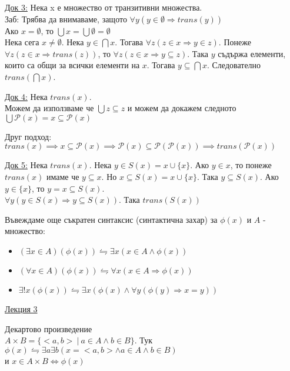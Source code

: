 \documentclass[fleqn, titlepage, 12pt]{report}
\begin{document}
\underline{Док 3:} Нека x е множество от транзитивни множества.\\
Заб: Трябва да внимаваме, защото $ \forall{y} (y \in \emptyset \Rightarrow trans(y) )$\\
Ако $x = \emptyset $, то $ \bigcup{x} = \bigcup{ \emptyset } = \emptyset $\\
Нека сега $x \neq \emptyset $. Нека $y \in \bigcap{x}$. Тогава $ \forall{z} (z \in x \Rightarrow y \in z)$.
Понеже $ \forall{z} (z \in x \Rightarrow trans(z) )$, то $ \forall{z} (z \in x \Rightarrow y \subseteq z)$.
Така $y$ съдържа елементи, които са общи за всички елементи на $x$. Тогава $y \subseteq \bigcap{x} $.
Следователно $ trans( \bigcap{x} )$.
\bigbreak

\underline{Док 4:} Нека $trans(x)$.\\
Можем да използваме че $ \bigcup{z} \subseteq z$
и можем да докажем следното $ \bigcup{ \mathcal{P}(x) = x \subseteq \mathcal{P}(x) } $
\bigbreak

Друг подход:\\
$trans(x) \implies x \subseteq \mathcal{P}(x) \implies \mathcal{P}(x) \subseteq \mathcal{P}( \mathcal{P}(x) ) \implies trans( \mathcal{P}(x) )$
\bigbreak

\underline{Док 5:} Нека $trans(x)$. Нека $y \in S(x) = x \cup \{ x\}$.
Ако $y \in x$, то понеже $trans(x)$ имаме че $y \subseteq x$. Но $x \subseteq S(x) = x \cup \{ x\}$.
Така $y \subseteq S(x)$. Ако $y \in \{ x\}$, то $y = x \subseteq S(x)$.\\
$ \forall{y} (y \in S(x) \Rightarrow y \subseteq S(x))$. Така $trans(S(x))$
\bigbreak

Въвеждаме още съкратен синтаксис (синтактична захар) за $ \phi(x)$ и $A$ - множество:
\begin{itemize}
  \item $ (\exists{x \in A}) ( \phi(x)) \leftrightharpoons \exists{x} (x \in A \land \phi(x) )$
  \item $ (\forall{x \in A}) ( \phi(x)) \leftrightharpoons \forall{x} (x \in A \Rightarrow \phi(x) )$
  \item $ \exists{!x} ( \phi(x) ) \leftrightharpoons \exists{x} ( \phi(x) \land \forall{y} ( \phi(y) \Rightarrow x = y))$
\end{itemize}

\clearpage
\begin{center}
  \underline{\huge\normalfont Лекция 3}
\end{center}
\bigbreak

 Декартово произведение\\
$A \times B = \{<a,b>\ |\ a \in A \land b \in B\}$.
Тук $ \phi(x) \leftrightharpoons \exists{a} \exists{b} ( x = <a,b> \land a \in A \land b \in B)$\\
и $ x \in A \times B \Leftrightarrow \phi(x) $
\bigbreak
\end{document}
